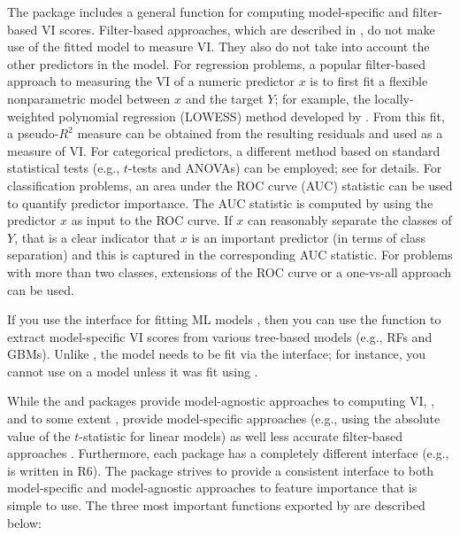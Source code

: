 The  package \citep{R-caret} includes a general
 function for computing model-specific and filter-based
VI scores. Filter-based approaches, which are described in
\citet{applied-kuhn-2013}, do not make use of the fitted model to
measure VI. They also do not take into account the other predictors in
the model. For regression problems, a popular filter-based approach to
measuring the VI of a numeric predictor \(x\) is to first fit a flexible
nonparametric model between \(x\) and the target \(Y\); for example, the
locally-weighted polynomial regression (LOWESS) method developed by
\citet{robust-cleveland-1979}. From this fit, a pseudo-\(R^2\) measure
can be obtained from the resulting residuals and used as a measure of
VI. For categorical predictors, a different method based on standard
statistical tests (e.g., \(t\)-tests and ANOVAs) can be employed; see
\citet{applied-kuhn-2013} for details. For classification problems, an
area under the ROC curve (AUC) statistic can be used to quantify
predictor importance. The AUC statistic is computed by using the
predictor \(x\) as input to the ROC curve. If \(x\) can reasonably
separate the classes of \(Y\), that is a clear indicator that \(x\) is
an important predictor (in terms of class separation) and this is
captured in the corresponding AUC statistic. For problems with more than
two classes, extensions of the ROC curve or a one-vs-all approach can be
used.

If you use the  interface for fitting ML models
\citep{R-mlr}, then you can use the 
function to extract model-specific VI scores from various tree-based
models (e.g., RFs and GBMs). Unlike , the model needs to be
fit via the  interface; for instance, you cannot use
 on a  model \citep{R-gbm}
unless it was fit using .

While the  and  packages provide model-agnostic
approaches to computing VI, , and to some extent ,
provide model-specific approaches (e.g., using the absolute value of the
\(t\)-statistic for linear models) as well less accurate filter-based
approaches . Furthermore, each package has a completely different
interface (e.g.,  is written in R6). The  package
\citep{R-vip} strives to provide a consistent interface to both
model-specific and model-agnostic approaches to feature importance that
is simple to use. The three most important functions exported by
 are described below:

